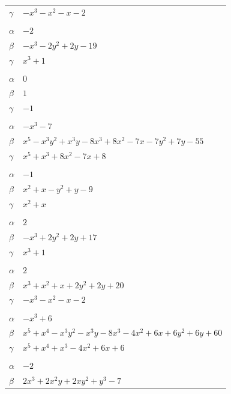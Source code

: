 \documentclass[11pt]{article}
\begin{document}
\begin{longtable}{@{}ll@{}}
$\gamma$ & $-x^{3}-x^{2}-x-2$\\
\addlinespace[3pt]
\multicolumn{2}{@{}l}{$\{i,j\}=\{2,11\}$, $k_{ij}=2^{4}$}\\
$\alpha$ & $-2$\\
$\beta$ & $-x^{3}-2y^{2}+2y-19$\\
$\gamma$ & $x^{3}+1$\\
\addlinespace[3pt]
\multicolumn{2}{@{}l}{$\{i,j\}=\{2,32\}$, $k_{ij}=1$}\\
$\alpha$ & $0$\\
$\beta$ & $1$\\
$\gamma$ & $-1$\\
\addlinespace[3pt]
\multicolumn{2}{@{}l}{$\{i,j\}=\{2,40\}$, $k_{ij}=2^{4}\cdot 3$}\\
$\alpha$ & $-x^{3}-7$\\
$\beta$ & $x^{5}-x^{3}y^{2}+x^{3}y-8x^{3}+8x^{2}-7x-7y^{2}+7y-55$\\
$\gamma$ & $x^{5}+x^{3}+8x^{2}-7x+8$\\
\addlinespace[3pt]
\multicolumn{2}{@{}l}{$\{i,j\}=\{2,44\}$, $k_{ij}=2^{3}$}\\
$\alpha$ & $-1$\\
$\beta$ & $x^{2}+x-y^{2}+y-9$\\
$\gamma$ & $x^{2}+x$\\
\addlinespace[3pt]
\multicolumn{2}{@{}l}{$\{i,j\}=\{3,9\}$, $k_{ij}=2^{2}\cdot 5$}\\
$\alpha$ & $2$\\
$\beta$ & $-x^{3}+2y^{2}+2y+17$\\
$\gamma$ & $x^{3}+1$\\
\addlinespace[3pt]
\multicolumn{2}{@{}l}{$\{i,j\}=\{3,11\}$, $k_{ij}=2^{3}\cdot 3$}\\
$\alpha$ & $2$\\
$\beta$ & $x^{3}+x^{2}+x+2y^{2}+2y+20$\\
$\gamma$ & $-x^{3}-x^{2}-x-2$\\
\addlinespace[3pt]
\multicolumn{2}{@{}l}{$\{i,j\}=\{3,15\}$, $k_{ij}=2^{2}\cdot 3\cdot 5$}\\
$\alpha$ & $-x^{3}+6$\\
$\beta$ & $x^{5}+x^{4}-x^{3}y^{2}-x^{3}y-8x^{3}-4x^{2}+6x+6y^{2}+6y+60$\\
$\gamma$ & $x^{5}+x^{4}+x^{3}-4x^{2}+6x+6$\\
\addlinespace[3pt]
\multicolumn{2}{@{}l}{$\{i,j\}=\{4,10\}$, $k_{ij}=2^{4}$}\\
$\alpha$ & $-2$\\
$\beta$ & $2x^{3}+2x^{2}y+2xy^{2}+y^{3}-7$\\

\end{longtable}
\end{document}
